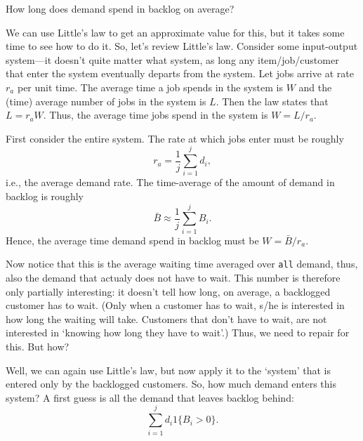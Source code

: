 \begin{question}
  How long does demand spend in backlog on average?
  \begin{solution}
    We can use Little's law to get an approximate value for this, but
    it takes some time to see how to do it. So, let's review Little's
    law. Consider some input-output system---it doesn't quite matter
    what system, as long any item/job/customer that enter the system
    eventually departs from the system.  Let jobs arrive at rate $r_a$
    per unit time. The average time a job spends in the system is $W$
    and the (time) average number of jobs in the system is $L$. Then
    the law states that $L = r_a W$.  Thus, the average time jobs
    spend in the system is $W = L/r_a$.

    First consider the entire system. The rate at which jobs enter must be roughly 
    \begin{equation*}
      r_a = \frac 1 j \sum_{i=1}^j d_i,
    \end{equation*}
    i.e., the average demand rate. The time-average of the amount of
    demand in backlog is roughly
    \begin{equation*}
    \bar B \approx \frac 1 j \sum_{i=1}^j B_i.
    \end{equation*}
    Hence, the average time demand spend in backlog must be
    $W =  \bar B /r_a$.

    Now notice that this is the average waiting time averaged over
    \texttt{all} demand, thus, also the demand that actualy does not
    have to wait. This number is therefore only partially interesting:
    it doesn't tell how long, on average, a backlogged customer has to
    wait. (Only when a customer has to wait, s/he is interested in how
    long the waiting will take. Customers that don't have to wait, are
    not interested in `knowing how long they have to wait'.) Thus, we
    need to repair for this. But how? 

    Well, we can again use Little's law, but now apply it to the
    `system' that is entered only by the backlogged customers.  So,
    how much demand enters this system?  A first guess is all the demand that leaves backlog behind:
    \begin{equation*}
      \sum_{i=1}^j d_i 1\{B_i > 0\}.
    \end{equation*} 
 


\end{solution}
\end{question}
